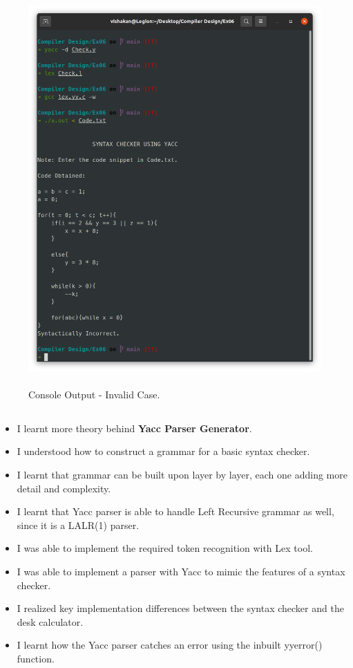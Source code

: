 \documentclass[12pt, a4]{article}
\begin{document}
\subsection*{}
\begin{figure}[h]
\centering
\caption{Console Output - Invalid Case.}
\includegraphics[height=15cm, width=15cm]{Output2.png}
\end{figure}

\newpage
\subsection*{}
\begin{itemize}
\item I learnt more theory behind \textbf{Yacc Parser Generator}.
\item I understood how to construct a grammar for a basic syntax checker.
\item I learnt that grammar can be built upon layer by layer, each one adding more detail and complexity.
\item I learnt that Yacc parser is able to handle Left Recursive grammar as well, since it is a LALR(1) parser.
\item I was able to implement the required token recognition with Lex tool.
\item I was able to implement a parser with Yacc to mimic the features of a syntax checker.
\item I realized key implementation differences between the syntax checker and the desk calculator.
\item I learnt how the Yacc parser catches an error using the inbuilt yyerror() function.

\end{itemize}
\end{document}
